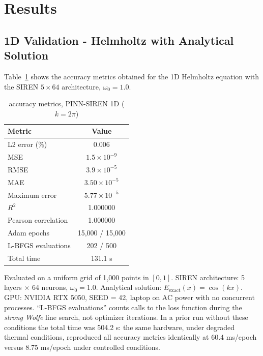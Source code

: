 
\section{Results}
\label{sec:results}

\subsection{1D Validation - Helmholtz with Analytical Solution}
\label{subsec:results1d}

Table~\ref{tab:results1d} shows the accuracy metrics obtained for the 1D Helmholtz
equation with the SIREN $5\times64$ architecture, $\omega_0 = 1.0$.

\begin{table}[t]
\centering
\renewcommand{\arraystretch}{1.2}
\caption{accuracy metrics, PINN-SIREN 1D ($k = 2\pi$)}
\label{tab:results1d}
\begin{tabular}{lc}
\hline
Metric & Value \\
\hline
L2 error (\%)          & 0.006 \\
MSE                    & $1.5 \times 10^{-9}$ \\
RMSE                   & $3.9 \times 10^{-5}$ \\
MAE                    & $3.50 \times 10^{-5}$ \\
Maximum error          & $5.77 \times 10^{-5}$ \\
$R^2$                  & 1.000000 \\
Pearson correlation    & 1.000000 \\
\hline
Adam epochs            & 15{,}000 / 15{,}000 \\
L-BFGS evaluations     & 202 / 500 \\
Total time             & 131.1 s \\
\hline
\end{tabular}
\end{table}
\noindent\footnotesize Evaluated on a uniform grid of 1{,}000 points in $[0,1]$.
SIREN architecture: 5 layers $\times$ 64 neurons, $\omega_0 = 1.0$.
Analytical solution: $E_{\mathrm{exact}}(x) = \cos(kx)$.
GPU: NVIDIA RTX 5050, SEED = 42, laptop on AC power with no concurrent
processes. ``L-BFGS evaluations'' counts calls to the loss function during
the \textit{strong Wolfe} line search, not optimizer iterations. In a prior
run without these conditions the total time was 504.2 s: the same hardware,
under degraded thermal conditions, reproduced all accuracy metrics
identically at 60.4 ms/epoch versus 8.75 ms/epoch under controlled
conditions.
\normalsize

